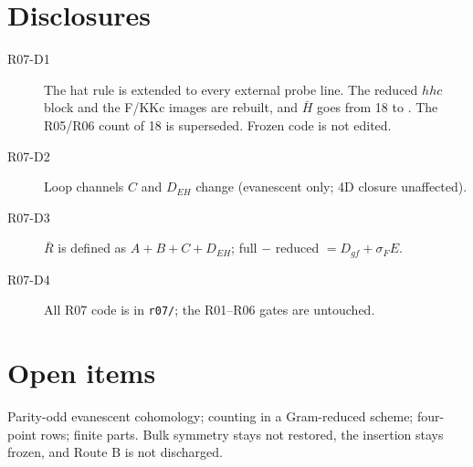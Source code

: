 \documentclass[11pt]{article}
\begin{document}
\section{Disclosures}
\begin{description}
\item[R07-D1] The hat rule is extended to every external probe line. The reduced $hhc$ block and the F/KKc images are
rebuilt, and $\bar H$ goes from 18 to \HB. The R05/R06 count of 18 is superseded. Frozen code is not edited.
\item[R07-D2] Loop channels $C$ and $D_{EH}$ change (evanescent only; 4D closure unaffected).
\item[R07-D3] $\bar R$ is defined as $A+B+C+D_{EH}$; full $-$ reduced $=D_{gf}+\sigma_FE$.
\item[R07-D4] All R07 code is in \texttt{r07/}; the R01--R06 gates are untouched.
\end{description}

\section{Open items}
Parity-odd evanescent cohomology; counting in a Gram-reduced scheme; four-point rows; finite parts. Bulk symmetry stays
not restored, the insertion stays frozen, and Route B is not discharged.
\end{document}
